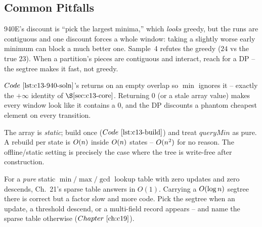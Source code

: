 \subsection{Common Pitfalls}

\begin{warningbox}
940E's discount is ``pick the largest minima,'' which \emph{looks} greedy, but the
runs are contiguous and one discount forces a whole window: taking a slightly
worse early minimum can block a much better one.  Sample~4 refutes the greedy
(\(24\) vs the true \(23\)).  When a partition's pieces are contiguous and
interact, reach for a DP -- the segtree makes it fast, not greedy.
\end{warningbox}

\begin{warningbox}
\(\coderef{c13-940-soln}\)'s  returns  on an empty
overlap so \(\min\) ignores it -- exactly the \(+\infty\) identity of
\(\secref{c13-core}\).  Returning \(0\) (or a stale array value) makes every
window look like it contains a \(0\), and the DP discounts a phantom cheapest
element on every transition.
\end{warningbox}

\begin{warningbox}
The array is \emph{static}; build once (\(\coderef{c13-build}\)) and treat
\(\mathit{queryMin}\) as pure.  A rebuild per state is \(O(n)\) inside
\(O(n)\) states -- \(O(n^2)\) for no reason.  The offline/static setting
is precisely the case where the tree is write-free after construction.
\end{warningbox}

\begin{warningbox}
For a \emph{pure} static \(\min/\max/\gcd\) lookup table with zero updates and
zero descends, Ch.~21's sparse table answers in \(O(1)\).  Carrying a
\(O(\log n)\) segtree there is correct but a factor slow and more code.  Pick
the segtree when an update, a threshold descend, or a multi-field record appears
-- and name the sparse table otherwise (\(\chref{c19}\)).
\end{warningbox}

